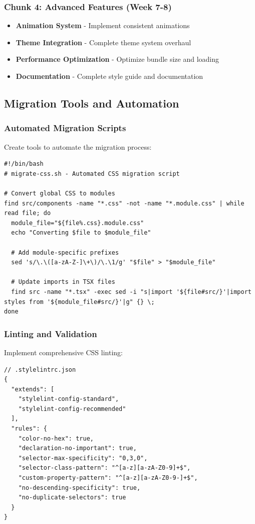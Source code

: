 \documentclass[11pt]{article}
\begin{document}
\subsubsection{Chunk 4: Advanced Features (Week 7-8)}

\begin{itemize}
\item \textbf{Animation System} - Implement consistent animations
\item \textbf{Theme Integration} - Complete theme system overhaul
\item \textbf{Performance Optimization} - Optimize bundle size and loading
\item \textbf{Documentation} - Complete style guide and documentation
\end{itemize}

\subsection{Migration Tools and Automation}

\subsubsection{Automated Migration Scripts}

Create tools to automate the migration process:

\begin{lstlisting}[style=bash]
#!/bin/bash
# migrate-css.sh - Automated CSS migration script

# Convert global CSS to modules
find src/components -name "*.css" -not -name "*.module.css" | while read file; do
  module_file="${file%.css}.module.css"
  echo "Converting $file to $module_file"
  
  # Add module-specific prefixes
  sed 's/\.\([a-zA-Z-]\+\)/\.\1/g' "$file" > "$module_file"
  
  # Update imports in TSX files
  find src -name "*.tsx" -exec sed -i "s|import '${file#src/}'|import styles from '${module_file#src/}'|g" {} \;
done
\end{lstlisting}

\subsubsection{Linting and Validation}

Implement comprehensive CSS linting:

\begin{lstlisting}[style=json]
// .stylelintrc.json
{
  "extends": [
    "stylelint-config-standard",
    "stylelint-config-recommended"
  ],
  "rules": {
    "color-no-hex": true,
    "declaration-no-important": true,
    "selector-max-specificity": "0,3,0",
    "selector-class-pattern": "^[a-z][a-zA-Z0-9]+$",
    "custom-property-pattern": "^[a-z][a-zA-Z0-9-]+$",
    "no-descending-specificity": true,
    "no-duplicate-selectors": true
  }
}
\end{lstlisting}
\end{document}
